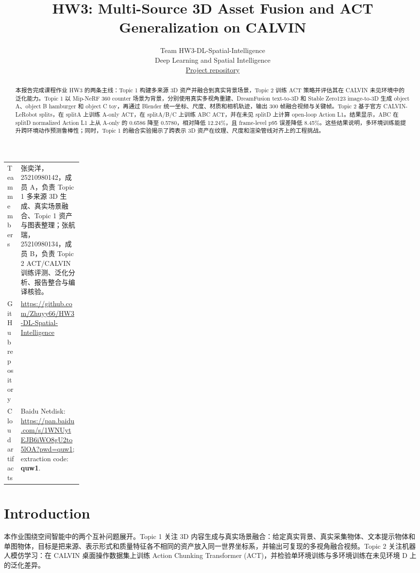 \documentclass{article}
\title{HW3: Multi-Source 3D Asset Fusion and ACT Generalization on CALVIN}
\author{%
	Team HW3-DL-Spatial-Intelligence\\
	Deep Learning and Spatial Intelligence\\
	\href{https://github.com/Zhuyy66/HW3-DL-Spatial-Intelligence}{Project repository}
}
\begin{document}
	\maketitle

	\begin{center}
		\small
		\begin{tabularx}{0.96\linewidth}{@{}p{0.18\linewidth}X@{}}
			\toprule
			Team members & 张奕洋，25210980142，成员 A，负责 Topic 1 多来源 3D 生成、真实场景融合、Topic 1 资产与图表整理；张航瑞，25210980134，成员 B，负责 Topic 2 ACT/CALVIN 训练评测、泛化分析、报告整合与编译核验。 \\
			GitHub repository & \href{https://github.com/Zhuyy66/HW3-DL-Spatial-Intelligence}{https://github.com/Zhuyy66/HW3-DL-Spatial-Intelligence} \\
			Cloud artifacts & Baidu Netdisk: \href{https://pan.baidu.com/s/1WNUytEJB6iWO8gU2to5lOA?pwd=quw1}{https://pan.baidu.com/s/1WNUytEJB6iWO8gU2to5lOA?pwd=quw1}; extraction code: \textbf{quw1}. \\
			\bottomrule
		\end{tabularx}
	\end{center}
	\vspace{0.6em}

	\begin{abstract}
		本报告完成课程作业 HW3 的两条主线：Topic 1 构建多来源 3D 资产并融合到真实背景场景，Topic 2 训练 ACT 策略并评估其在 CALVIN 未见环境中的泛化能力。Topic 1 以 Mip-NeRF 360 counter 场景为背景，分别使用真实多视角重建、DreamFusion text-to-3D 和 Stable Zero123 image-to-3D 生成 object A、object B hamburger 和 object C toy，再通过 Blender 统一坐标、尺度、材质和相机轨迹，输出 300 帧融合视频与关键帧。Topic 2 基于官方 CALVIN-LeRobot splits，在 splitA 上训练 A-only ACT，在 splitA/B/C 上训练 ABC ACT，并在未见 splitD 上计算 open-loop Action L1。结果显示，ABC 在 splitD normalized Action L1 上从 A-only 的 0.6586 降至 0.5780，相对降低 12.24\%，且 frame-level p95 误差降低 8.45\%。这些结果说明，多环境训练能提升跨环境动作预测鲁棒性；同时，Topic 1 的融合实验揭示了跨表示 3D 资产在纹理、尺度和渲染管线对齐上的工程挑战。
	\end{abstract}

	\section{Introduction}

	本作业围绕空间智能中的两个互补问题展开。Topic 1 关注 3D 内容生成与真实场景融合：给定真实背景、真实采集物体、文本提示物体和单图物体，目标是把来源、表示形式和质量特征各不相同的资产放入同一世界坐标系，并输出可复现的多视角融合视频。Topic 2 关注机器人模仿学习：在 CALVIN 桌面操作数据集上训练 Action Chunking Transformer (ACT)，并检验单环境训练与多环境训练在未见环境 D 上的泛化差异。
\end{document}
